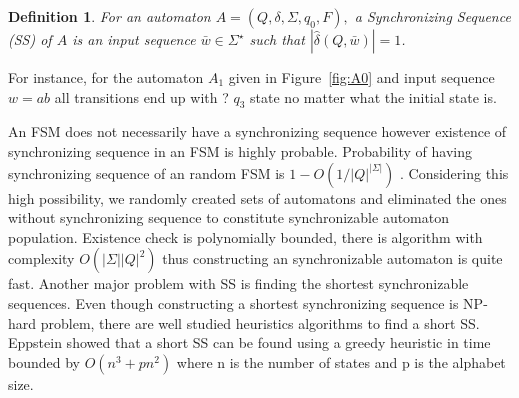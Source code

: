 \documentclass[12pt]{article}
\newtheorem{definition}{Definition}
\begin{document}
\begin{definition}
For an automaton $A = (Q,\delta, \Sigma, q_{0}, F),$ a {\em Synchronizing Sequence (SS)} of $A$ is an input sequence $\bar{w}\in \Sigma^\star$ such that $|\hat{\delta}(Q,\bar{w})| = 1$.
\end{definition}

For instance, for the automaton $A_{1}$ given in Figure~\ref{fig:A0} and input sequence $w = ab$ all transitions end up with ? $q_{3}$ state no matter what the initial state is. 

\par An FSM does not necessarily have a synchronizing sequence however existence of synchronizing sequence in an FSM is highly probable. Probability of having synchronizing sequence of an random FSM is $1-O(1/|Q|^{|\Sigma|})$
\cite{berlinkov}. Considering this high possibility, we randomly created sets of automatons and eliminated the ones without synchronizing sequence to constitute synchronizable automaton population. Existence check is polynomially bounded, there is algorithm with complexity $O(|\Sigma||Q|^2)$ \cite{eppstein_1990} thus constructing an synchronizable automaton is quite fast. Another major problem with SS is finding the shortest synchronizable sequences.  Even though constructing a shortest synchronizing sequence is NP-hard problem, there are well studied heuristics algorithms to find a short SS. Eppstein showed that a short SS can be found using a greedy heuristic in time bounded by $O(n^3 + pn^2)$ where n is the number of states and p is the alphabet size\cite{eppstein_1990}. 




\newpage


\end{document}
